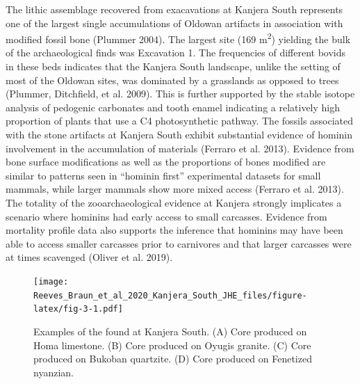 \documentclass[]{elsarticle} %
\begin{document}
The lithic assemblage recovered from exacavations at Kanjera South
represents one of the largest single accumulations of Oldowan artifacts
in association with modified fossil bone (Plummer 2004). The largest
site (169 m\textsuperscript{2}) yielding the bulk of the archaeological
finds was Excavation 1. The frequencies of different bovids in these
beds indicates that the Kanjera South landscape, unlike the setting of
most of the Oldowan sites, was dominated by a grasslands as opposed to
trees (Plummer, Ditchfield, et al. 2009). This is further supported by
the stable isotope analysis of pedogenic carbonates and tooth enamel
indicating a relatively high proportion of plants that use a C4
photosynthetic pathway. The fossils associated with the stone artifacts
at Kanjera South exhibit substantial evidence of hominin involvement in
the accumulation of materials (Ferraro et al. 2013). Evidence from bone
surface modifications as well as the proportions of bones modified are
similar to patterns seen in ``hominin first'' experimental datasets for
small mammals, while larger mammals show more mixed access (Ferraro et
al. 2013). The totality of the zooarchaeological evidence at Kanjera
strongly implicates a scenario where hominins had early access to small
carcasses. Evidence from mortality profile data also supports the
inference that hominins may have been able to access smaller carcasses
prior to carnivores and that larger carcasses were at times scavenged
(Oliver et al. 2019).

\begin{figure}
\centering
\texttt{[image: Reeves\_Braun\_et\_al\_2020\_Kanjera\_South\_JHE\_files/figure-latex/fig-3-1.pdf]}
\caption{Examples of the found at Kanjera South. (A) Core produced on
Homa limestone. (B) Core produced on Oyugis granite. (C) Core produced
on Bukoban quartzite. (D) Core produced on Fenetized nyanzian.
\label{tools}}
\end{figure}
\end{document}
